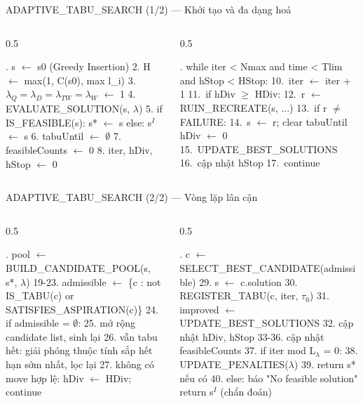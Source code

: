 \documentclass[aspectratio=169]{beamer}
\newenvironment{pseudo}{\par\scriptsize\ttfamily\obeylines\obeyspaces}{\par}
\newcommand{\ind}{\hspace*{1.2em}}
\begin{document}
\begin{frame}[fragile]{ADAPTIVE\_TABU\_SEARCH (1/2) — Khởi tạo và đa dạng hoá}
  \begin{columns}[T]
    \begin{column}{0.5\textwidth}
      \begin{pseudo}
1. s $\leftarrow$ s0 (Greedy Insertion)
2. H $\leftarrow$ max(1, C(s0), max l\_i)
3. $\lambda_Q = \lambda_D = \lambda_{TW} = \lambda_W$ $\leftarrow$ 1
4. EVALUATE\_SOLUTION(s, $\lambda$)
5. if IS\_FEASIBLE(s): s* $\leftarrow$ s
\ind else: s$^I$ $\leftarrow$ s
6. tabuUntil $\leftarrow$ $\emptyset$
7. feasibleCounts $\leftarrow$ 0
8. iter, hDiv, hStop $\leftarrow$ 0
      \end{pseudo}
    \end{column}
    \begin{column}{0.5\textwidth}
      \begin{pseudo}
9. while iter < Nmax and time < Tlim
\ind\ind and hStop < HStop:
10.\ iter $\leftarrow$ iter + 1
11.\ if hDiv $\ge$ HDiv:
12.\ \ind r $\leftarrow$ RUIN\_RECREATE(s, ...)
13.\ \ind if r $\ne$ FAILURE:
14.\ \ind\ind s $\leftarrow$ r; clear tabuUntil
\ind\ind\ind hDiv $\leftarrow$ 0
15.\ \ind UPDATE\_BEST\_SOLUTIONS
16.\ \ind cập nhật hStop
17.\ \ind continue
      \end{pseudo}
    \end{column}
  \end{columns}
\end{frame}

\begin{frame}[fragile]{ADAPTIVE\_TABU\_SEARCH (2/2) — Vòng lặp lân cận}
  \begin{columns}[T]
    \begin{column}{0.5\textwidth}
      \begin{pseudo}
18. pool $\leftarrow$ BUILD\_CANDIDATE\_POOL(s, s*, $\lambda$)
19-23. admissible $\leftarrow$ \{c : not IS\_TABU(c)
\ind\ind\ind or SATISFIES\_ASPIRATION(c)\}
24. if admissible = $\emptyset$:
25. \ind mở rộng candidate list, sinh lại
26. \ind vẫn tabu hết: giải phóng thuộc tính
\ind\ind sắp hết hạn sớm nhất, lọc lại
27. \ind không có move hợp lệ:
\ind\ind hDiv $\leftarrow$ HDiv; continue
      \end{pseudo}
    \end{column}
    \begin{column}{0.5\textwidth}
      \begin{pseudo}
28. c $\leftarrow$ SELECT\_BEST\_CANDIDATE(admissible)
29. s $\leftarrow$ c.solution
30. REGISTER\_TABU(c, iter, $\tau_0$)
31. improved $\leftarrow$ UPDATE\_BEST\_SOLUTIONS
32. cập nhật hDiv, hStop
33-36. cập nhật feasibleCounts
37. if iter mod L$_\lambda$ = 0:
38. \ind UPDATE\_PENALTIES($\lambda$)
39. return s* nếu có
40. else: báo "No feasible solution"
\ind\ind return s$^I$ (chẩn đoán)
      \end{pseudo}
    \end{column}
  \end{columns}
\end{frame}
\end{document}
